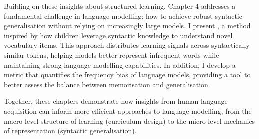 Building on these insights about structured learning, Chapter 4 addresses a fundamental challenge in language modelling: how to achieve robust syntactic generalisation without relying on increasingly large models. I present \smoothing, a method inspired by how children leverage syntactic knowledge to understand novel vocabulary items. This approach distributes learning signals across syntactically similar tokens, helping models better represent infrequent words while maintaining strong language modelling capabilities. In addition, I develop a metric that quantifies the frequency bias of language models, providing a tool to better assess the balance between memorisation and generalisation.

Together, these chapters demonstrate how insights from human language acquisition can inform more efficient approaches to language modelling, from the macro-level structure of learning (curriculum design) to the micro-level mechanics of representation (syntactic generalisation).